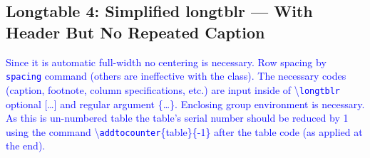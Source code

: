 \documentclass[phd]{ndsu-thesis-2022}
\newcommand\italk[1]{\textcolor{blue}{#1}}  %
\newcommand\cmd[1]{\textbackslash\texttt{#1}}  %
\begin{document}
\subsection{Longtable 4: Simplified longtblr --- With Header But No Repeated Caption }

\italk{Since it is automatic full-width no centering is necessary. Row spacing by \texttt{spacing} command (others are ineffective with the class). The necessary codes (caption, footnote, column specifications, etc.) are input inside of \cmd{longtblr} optional [\ldots] and regular argument \{\ldots\}. Enclosing group environment is necessary. As this is un-numbered table the table's serial number should be reduced by 1 using the command \cmd{addtocounter}\{table\}\{-1\} after the table code (as applied at the end).}
\end{document}

